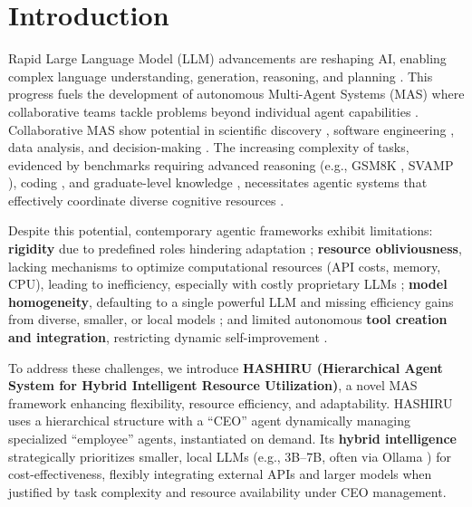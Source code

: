 \documentclass[conference]{IEEEtran}
\begin{document}
\section{Introduction}\label{sec:introduction}

Rapid Large Language Model (LLM) advancements are reshaping AI, enabling complex language understanding, generation, reasoning, and planning \cite{brown2020language, devlin2019bert, raffel2020exploring}. This progress fuels the development of autonomous Multi-Agent Systems (MAS) where collaborative teams tackle problems beyond individual agent capabilities \cite{dorri2018multi, wooldridge2009introduction}. Collaborative MAS show potential in scientific discovery \cite{boiko2023emergent}, software engineering \cite{qian2023communicative}, data analysis, and decision-making \cite{wang2023decision}. The increasing complexity of tasks, evidenced by benchmarks requiring advanced reasoning (e.g., GSM8K \cite{cobbe2021gsm8k}, SVAMP \cite{patel2021svamp}), coding \cite{chen2021codex, pai2024codocbench}, and graduate-level knowledge \cite{phan2025humanitysexam}, necessitates agentic systems that effectively coordinate diverse cognitive resources \cite{wen2024benchmarkingcomplexinstructionfollowingmultiple}.

Despite this potential, contemporary agentic frameworks exhibit limitations: \textbf{rigidity} due to predefined roles hindering adaptation \cite{zhang2023building}; \textbf{resource obliviousness}, lacking mechanisms to optimize computational resources (API costs, memory, CPU), leading to inefficiency, especially with costly proprietary LLMs \cite{park2023generative}; \textbf{model homogeneity}, defaulting to a single powerful LLM and missing efficiency gains from diverse, smaller, or local models \cite{zhou2023agents}; and limited autonomous \textbf{tool creation and integration}, restricting dynamic self-improvement \cite{wang2023voyager, yao2022react, parisi2022talm}.

To address these challenges, we introduce \textbf{HASHIRU (Hierarchical Agent System for Hybrid Intelligent Resource Utilization)}, a novel MAS framework enhancing flexibility, resource efficiency, and adaptability. HASHIRU uses a hierarchical structure with a ``CEO'' agent dynamically managing specialized ``employee'' agents, instantiated on demand. Its \textbf{hybrid intelligence} strategically prioritizes smaller, local LLMs (e.g., 3B--7B, often via Ollama \cite{ollama}) for cost-effectiveness, flexibly integrating external APIs and larger models when justified by task complexity and resource availability under CEO management.
\end{document}
